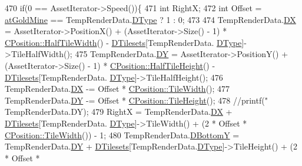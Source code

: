 \begin{DoxyCode}
470                 \textcolor{keywordflow}{if}(0 == AssetIterator->Speed())\{
471                     \textcolor{keywordtype}{int} RightX;
472                     \textcolor{keywordtype}{int} Offset = \hyperlink{GameDataTypes_8h_a5600d4fc433b83300308921974477feca243d9ba44092eadd561db058d742b3b3}{atGoldMine} == TempRenderData.\hyperlink{structSAssetRenderData_ae986cfe9d4238fa31fb511b40392d97f}{DType} ? 1 : 0;
473                     
474                     TempRenderData.\hyperlink{structSAssetRenderData_ab432edfd1146e38a92576b78e2ad5581}{DX} = AssetIterator->PositionX() + (AssetIterator->Size() - 1) * 
      \hyperlink{classCPosition_a4b799a0fb78ddd8bbd8548980e2458af}{CPosition::HalfTileWidth}() - \hyperlink{classCAssetRenderer_ae8201de704851c1de6424a8da77b785e}{DTilesets}[TempRenderData.
      \hyperlink{structSAssetRenderData_ae986cfe9d4238fa31fb511b40392d97f}{DType}]->TileHalfWidth();
475                     TempRenderData.\hyperlink{structSAssetRenderData_af27e8a46e21a0935983bfc0d34d9ceba}{DY} = AssetIterator->PositionY() + (AssetIterator->Size() - 1) * 
      \hyperlink{classCPosition_a5e371060b1aa0d3d3c5df1e353e0e5fd}{CPosition::HalfTileHeight}() - \hyperlink{classCAssetRenderer_ae8201de704851c1de6424a8da77b785e}{DTilesets}[TempRenderData.
      \hyperlink{structSAssetRenderData_ae986cfe9d4238fa31fb511b40392d97f}{DType}]->TileHalfHeight();
476                     TempRenderData.\hyperlink{structSAssetRenderData_ab432edfd1146e38a92576b78e2ad5581}{DX} -= Offset * \hyperlink{classCPosition_a27a7a8b9a5541da0aa8d97d785650fb8}{CPosition::TileWidth}();
477                     TempRenderData.\hyperlink{structSAssetRenderData_af27e8a46e21a0935983bfc0d34d9ceba}{DY} -= Offset * \hyperlink{classCPosition_ac4f0edd9c9632f1bdca981ef5d9b71e5}{CPosition::TileHeight}();
478                     \textcolor{comment}{//printf("%
       TempRenderData.DY);}
479                     RightX = TempRenderData.\hyperlink{structSAssetRenderData_ab432edfd1146e38a92576b78e2ad5581}{DX} + \hyperlink{classCAssetRenderer_ae8201de704851c1de6424a8da77b785e}{DTilesets}[TempRenderData.
      \hyperlink{structSAssetRenderData_ae986cfe9d4238fa31fb511b40392d97f}{DType}]->TileWidth() + (2 * Offset * \hyperlink{classCPosition_a27a7a8b9a5541da0aa8d97d785650fb8}{CPosition::TileWidth}()) - 1;
480                     TempRenderData.\hyperlink{structSAssetRenderData_a187b7d405b649f0f400a3a8204ef7de2}{DBottomY} = TempRenderData.\hyperlink{structSAssetRenderData_af27e8a46e21a0935983bfc0d34d9ceba}{DY} + 
      \hyperlink{classCAssetRenderer_ae8201de704851c1de6424a8da77b785e}{DTilesets}[TempRenderData.\hyperlink{structSAssetRenderData_ae986cfe9d4238fa31fb511b40392d97f}{DType}]->TileHeight() + (2 * Offset * 

\end{DoxyCode}
